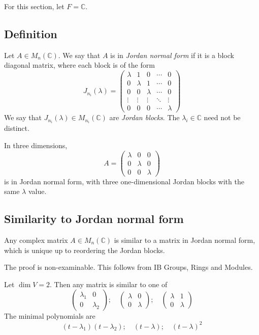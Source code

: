For this section, let \( F = \mathbb C \).

\subsection{Definition}
\begin{definition}
	Let \( A \in M_n(\mathbb C) \).
	We say that \( A \) is in \textit{Jordan normal form} if it is a block diagonal matrix, where each block is of the form
	\[
		J_{n_i}(\lambda) =
		\begin{pmatrix}
			\lambda & 1       & 0       & \cdots & 0       \\
			0       & \lambda & 1       & \cdots & 0       \\
			0       & 0       & \lambda & \cdots & 0       \\
			\vdots  & \vdots  & \vdots  & \ddots & \vdots  \\
			0       & 0       & 0       & \cdots & \lambda
		\end{pmatrix}
	\]
	We say that \( J_{n_i}(\lambda) \in M_{n_i}(\mathbb C) \) are \textit{Jordan blocks}.
	The \( \lambda_i \in \mathbb C \) need not be distinct.
\end{definition}
\begin{remark}
	In three dimensions,
	\[
		A =
		\begin{pmatrix}
			\lambda & 0       & 0       \\
			0       & \lambda & 0       \\
			0       & 0       & \lambda
		\end{pmatrix}
	\]
	is in Jordan normal form, with three one-dimensional Jordan blocks with the same \( \lambda \) value.
\end{remark}

\subsection{Similarity to Jordan normal form}
\begin{theorem}
	Any complex matrix \( A \in M_n(\mathbb C) \) is similar to a matrix in Jordan normal form, which is unique up to reordering the Jordan blocks.
\end{theorem}
The proof is non-examinable.
This follows from IB Groups, Rings and Modules.
\begin{example}
	Let \( \dim V = 2 \).
	Then any matrix is similar to one of
	\[
		\begin{pmatrix}
			\lambda_1 & 0         \\
			0         & \lambda_2
		\end{pmatrix};\quad
		\begin{pmatrix}
			\lambda & 0       \\
			0       & \lambda
		\end{pmatrix};\quad
		\begin{pmatrix}
			\lambda & 1       \\
			0       & \lambda
		\end{pmatrix}
	\]
	The minimal polynomials are
	\[
		(t-\lambda_1)(t-\lambda_2);\quad (t-\lambda);\quad (t-\lambda)^2
	\]
\end{example}

